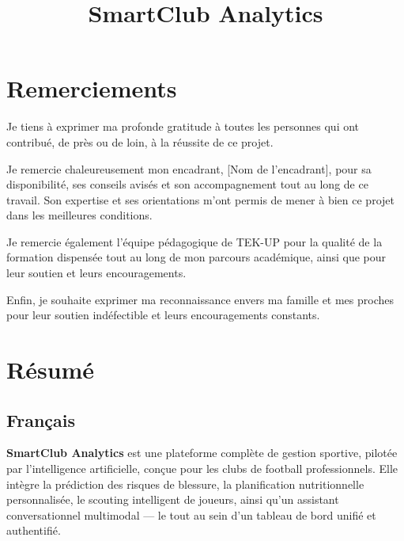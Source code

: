 \documentclass{modificopy}
\title{SmartClub Analytics}
\begin{document}






\fairemarges
\fairepagedegarde

\newpage

\chapter*{Remerciements}

Je tiens à exprimer ma profonde gratitude à toutes les personnes qui ont contribué, de près ou de loin, à la réussite de ce projet.

Je remercie chaleureusement mon encadrant, [Nom de l'encadrant], pour sa disponibilité, ses conseils avisés et son accompagnement tout au long de ce travail. Son expertise et ses orientations m'ont permis de mener à bien ce projet dans les meilleures conditions.

Je remercie également l'équipe pédagogique de TEK-UP pour la qualité de la formation dispensée tout au long de mon parcours académique, ainsi que pour leur soutien et leurs encouragements.

Enfin, je souhaite exprimer ma reconnaissance envers ma famille et mes proches pour leur soutien indéfectible et leurs encouragements constants.

\newpage

\chapter*{Résumé}

\section*{Français}

\textbf{SmartClub Analytics} est une plateforme complète de gestion sportive, pilotée par l'intelligence artificielle, conçue pour les clubs de football professionnels. Elle intègre la prédiction des risques de blessure, la planification nutritionnelle personnalisée, le scouting intelligent de joueurs, ainsi qu'un assistant conversationnel multimodal — le tout au sein d'un tableau de bord unifié et authentifié.
\end{document}
